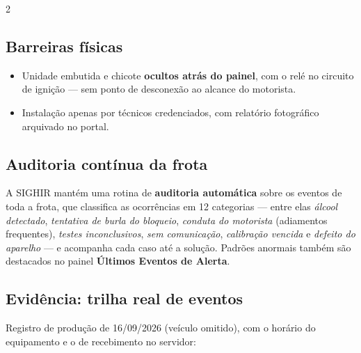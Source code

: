 \documentclass[a4paper,10pt]{article}
\begin{document}
\begin{multicols}{2}
\subsection{Barreiras físicas}
\begin{itemize}
  \item Unidade embutida e chicote \textbf{ocultos atrás do painel}, com o relé no circuito de ignição — sem ponto de desconexão ao alcance do motorista.
  \item Instalação apenas por técnicos credenciados, com relatório fotográfico arquivado no portal.
\end{itemize}

\subsection{Auditoria contínua da frota}
A SIGHIR mantém uma rotina de \textbf{auditoria automática} sobre os eventos de toda a frota,
que classifica as ocorrências em 12 categorias — entre elas \emph{álcool detectado},
\emph{tentativa de burla do bloqueio}, \emph{conduta do motorista} (adiamentos frequentes),
\emph{testes inconclusivos}, \emph{sem comunicação}, \emph{calibração vencida} e
\emph{defeito do aparelho} — e acompanha cada caso até a solução. Padrões anormais também são
destacados no painel \textbf{Últimos Eventos de Alerta}.

\columnbreak
\subsection{Evidência: trilha real de eventos}
Registro de produção de 16/09/2026 (veículo omitido), com o horário do equipamento e o de
recebimento no servidor:


\end{multicols}
\end{document}
